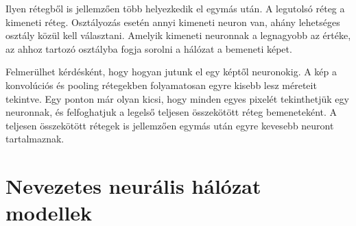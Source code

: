 Ilyen rétegből is jellemzően több helyezkedik el egymás után. A legutolsó réteg a kimeneti réteg. Osztályozás esetén annyi kimeneti neuron van, ahány lehetséges osztály közül kell választani. Amelyik kimeneti neuronnak a legnagyobb az értéke, az ahhoz tartozó osztályba fogja sorolni a hálózat a bemeneti képet.

Felmerülhet kérdésként, hogy hogyan jutunk el egy képtől neuronokig. A kép a konvolúciós és pooling rétegekben folyamatosan egyre kisebb lesz méreteit tekintve. Egy ponton már olyan kicsi, hogy minden egyes pixelét tekinthetjük egy neuronnak, és felfoghatjuk a legelső teljesen összekötött réteg bemeneteként. A teljesen összekötött rétegek is jellemzően egymás után egyre kevesebb neuront tartalmaznak.

\section{Nevezetes neurális hálózat modellek}


